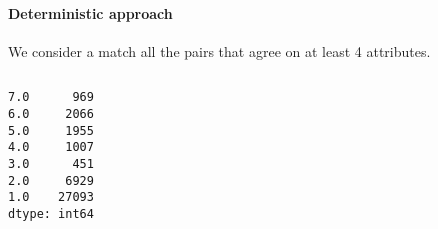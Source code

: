 \documentclass{article}
\begin{document}
\hypertarget{deterministic-approach}{%
\paragraph{Deterministic approach}\label{deterministic-approach}}

    We consider a match all the pairs that agree on at least 4 attributes.

    \begin{Verbatim}[commandchars=\\\{\}]

\end{Verbatim}
\begin{Verbatim}[commandchars=\\\{\}]
7.0      969
6.0     2066
5.0     1955
4.0     1007
3.0      451
2.0     6929
1.0    27093
dtype: int64
\end{Verbatim}
    \begin{Verbatim}[commandchars=\\\{\}]

\end{Verbatim}
\begin{Verbatim}[commandchars=\\\{\}]

\end{Verbatim}
    \begin{Verbatim}[commandchars=\\\{\}]

\end{Verbatim}
\end{document}
